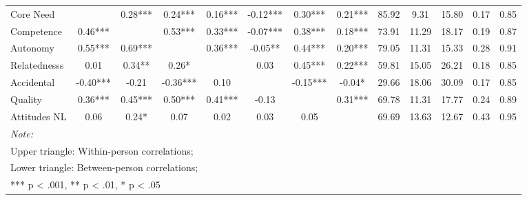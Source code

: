 \begin{table}
\begin{minipage}[t][\textheight][t]{\textwidth}
{\begin{tabular}[t]{lcccccccccccc}
\hspace{1em}Core Need &  & 0.28*** & 0.24*** & 0.16*** & -0.12*** & 0.30*** & 0.21*** & 85.92 & 9.31 & 15.80 & 0.17 & 0.85\\
\hspace{1em}Competence & 0.46*** &  & 0.53*** & 0.33*** & -0.07*** & 0.38*** & 0.18*** & 73.91 & 11.29 & 18.17 & 0.19 & 0.87\\
\hspace{1em}Autonomy & 0.55*** & 0.69*** &  & 0.36*** & -0.05** & 0.44*** & 0.20*** & 79.05 & 11.31 & 15.33 & 0.28 & 0.91\\
\hspace{1em}Relatednesss & 0.01 & 0.34** & 0.26* &  & 0.03 & 0.45*** & 0.22*** & 59.81 & 15.05 & 26.21 & 0.18 & 0.85\\
\hspace{1em}Accidental & -0.40*** & -0.21 & -0.36*** & 0.10 &  & -0.15*** & -0.04* & 29.66 & 18.06 & 30.09 & 0.17 & 0.85\\
\hspace{1em}Quality & 0.36*** & 0.45*** & 0.50*** & 0.41*** & -0.13 &  & 0.31*** & 69.78 & 11.31 & 17.77 & 0.24 & 0.89\\
\hspace{1em}Attitudes NL & 0.06 & 0.24* & 0.07 & 0.02 & 0.03 & 0.05 &  & 69.69 & 13.63 & 12.67 & 0.43 & 0.95\\
\bottomrule
\multicolumn{13}{l}{\rule{0pt}{1em}\textit{Note: }}\\
\multicolumn{13}{l}{\rule{0pt}{1em}Upper triangle: Within-person correlations;}\\
\multicolumn{13}{l}{\rule{0pt}{1em}Lower triangle: Between-person correlations;}\\
\multicolumn{13}{l}{\rule{0pt}{1em}*** p < .001, ** p < .01,  * p < .05}\\
\end{tabular}}
\end{minipage}
\end{table}
